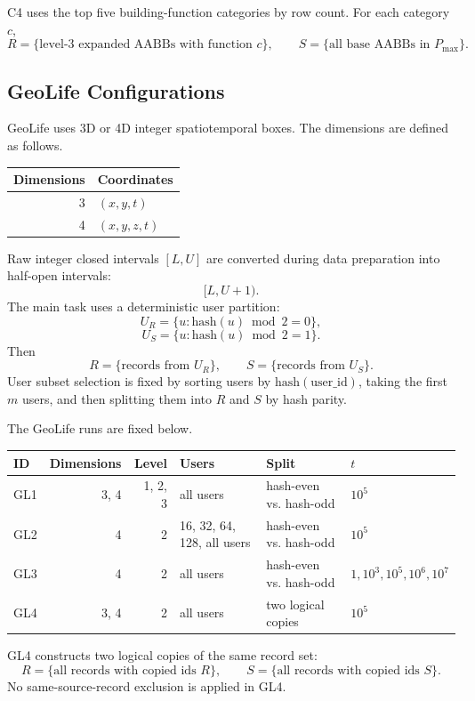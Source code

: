 \documentclass[11pt]{article}
\begin{document}
C4 uses the top five building-function categories by row count.  For each category $c$,
\[
R=\{\text{level-3 expanded AABBs with function }c\},
\qquad
S=\{\text{all base AABBs in }P_{\max}\}.
\]

\subsection{GeoLife Configurations}
GeoLife uses 3D or 4D integer spatiotemporal boxes.  The dimensions are defined as follows.

\begin{center}
\begin{tabularx}{0.5\linewidth}{@{}rY@{}}
\toprule
Dimensions & Coordinates \\
 & $(x,y,t)$ \\
4 & $(x,y,z,t)$ \\
\bottomrule
\end{tabularx}
\end{center}

Raw integer closed intervals $[L,U]$ are converted during data preparation into half-open intervals:
\[
[L,U+1).
\]
The main task uses a deterministic user partition:
\[
U_R=\{u:\mathrm{hash}(u)\bmod 2=0\},
\]
\[
U_S=\{u:\mathrm{hash}(u)\bmod 2=1\}.
\]
Then
\[
R=\{\text{records from }U_R\},
\qquad
S=\{\text{records from }U_S\}.
\]
User subset selection is fixed by sorting users by $\mathrm{hash}(\mathrm{user\_id})$, taking the first $m$ users, and then splitting them into $R$ and $S$ by hash parity.

The GeoLife runs are fixed below.

\begin{center}
\small
\begin{tabularx}{\linewidth}{@{}l r r Y Y Y@{}}
\toprule
ID & Dimensions & Level & Users & Split & $t$ \\
\midrule
GL1 & 3, 4 & 1, 2, 3 & all users & hash-even vs. hash-odd & $10^5$ \\
GL2 & 4 & 2 & 16, 32, 64, 128, all users & hash-even vs. hash-odd & $10^5$ \\
GL3 & 4 & 2 & all users & hash-even vs. hash-odd & $1,10^3,10^5,10^6,10^7$ \\
GL4 & 3, 4 & 2 & all users & two logical copies & $10^5$ \\
\bottomrule
\end{tabularx}
\end{center}

GL4 constructs two logical copies of the same record set:
\[
R=\{\text{all records with copied ids }R\},
\qquad
S=\{\text{all records with copied ids }S\}.
\]
No same-source-record exclusion is applied in GL4.
\end{document}
